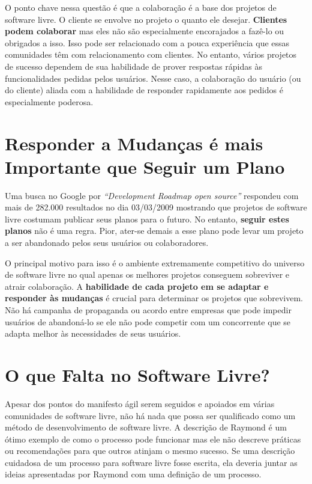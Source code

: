 O ponto chave nessa questão é que a colaboração é a base dos projetos
de software livre.  O cliente se envolve no projeto o quanto ele
desejar. \textbf{Clientes podem colaborar} mas eles não são
especialmente encorajados a fazê-lo ou obrigados a isso. Isso pode ser
relacionado com a pouca experiência que essas comunidades têm com
relacionamento com clientes. No entanto, vários projetos de sucesso
dependem de sua habilidade de prover respostas rápidas às
funcionalidades pedidas pelos usuários. Nesse caso, a colaboração do
usuário (ou do cliente) aliada com a habilidade de responder
rapidamente aos pedidos é especialmente poderosa.

\section{Responder a Mudanças é mais Importante que Seguir um Plano}
\label{sec:fourth-princ}

Uma busca no Google por \emph{``Development Roadmap open source''}
respondeu com mais de 282.000 resultados no dia 03/03/2009 mostrando
que projetos de software livre costumam publicar seus planos para o
futuro. No entanto, \textbf{seguir estes planos} não é uma
regra. Pior, ater-se demais a esse plano pode levar um projeto a ser
abandonado pelos seus usuários ou colaboradores.

O principal motivo para isso é o ambiente extremamente competitivo do
universo de software livre no qual apenas os melhores projetos
conseguem sobreviver e atrair colaboração. A \textbf{habilidade de
  cada projeto em se adaptar e responder às mudanças} é crucial para
determinar os projetos que sobrevivem. Não há campanha de propaganda
ou acordo entre empresas que pode impedir usuários de abandoná-lo se
ele não pode competir com um concorrente que se adapta melhor às
necessidades de seus usuários.

\section{O que Falta no Software Livre?}
\label{sec:os-summary}

Apesar dos pontos do manifesto ágil serem seguidos e apoiados em
várias comunidades de software livre, não há nada que possa ser
qualificado como um método de desenvolvimento de software livre. A
descrição de Raymond \cite{Raymond1999} é um ótimo exemplo de como o
processo pode funcionar mas ele não descreve práticas ou recomendações
para que outros atinjam o mesmo sucesso. Se uma descrição cuidadosa de
um processo para software livre fosse escrita, ela deveria juntar as
ideias apresentadas por Raymond com uma definição de um processo.

